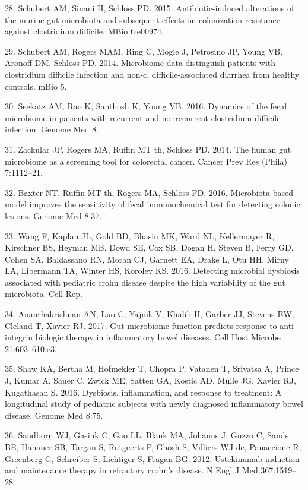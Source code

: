 \documentclass[11pt,]{article}
\begin{document}
\hypertarget{ref-Schubert_cdiff_2016}{}
28. Schubert AM, Sinani H, Schloss PD. 2015. Antibiotic-induced
alterations of the murine gut microbiota and subsequent effects on
colonization resistance against clostridium difficile. MBio 6:e00974.

\hypertarget{ref-Schubert_cdiff_2014}{}
29. Schubert AM, Rogers MAM, Ring C, Mogle J, Petrosino JP, Young VB,
Aronoff DM, Schloss PD. 2014. Microbiome data distinguish patients with
clostridium difficile infection and non-c. difficile-associated diarrhea
from healthy controls. mBio 5.

\hypertarget{ref-Seekatz_cdiff_2016}{}
30. Seekatz AM, Rao K, Santhosh K, Young VB. 2016. Dynamics of the fecal
microbiome in patients with recurrent and nonrecurrent clostridium
difficile infection. Genome Med 8.

\hypertarget{ref-zackular_CRC_2014}{}
31. Zackular JP, Rogers MA, Ruffin MT th, Schloss PD. 2014. The human
gut microbiome as a screening tool for colorectal cancer. Cancer Prev
Res (Phila) 7:1112--21.

\hypertarget{ref-baxter_FIT_2016}{}
32. Baxter NT, Ruffin MT th, Rogers MA, Schloss PD. 2016.
Microbiota-based model improves the sensitivity of fecal immunochemical
test for detecting colonic lesions. Genome Med 8:37.

\hypertarget{ref-wang_pedsCD_2016}{}
33. Wang F, Kaplan JL, Gold BD, Bhasin MK, Ward NL, Kellermayer R,
Kirschner BS, Heyman MB, Dowd SE, Cox SB, Dogan H, Steven B, Ferry GD,
Cohen SA, Baldassano RN, Moran CJ, Garnett EA, Drake L, Otu HH, Mirny
LA, Libermann TA, Winter HS, Korolev KS. 2016. Detecting microbial
dysbiosis associated with pediatric crohn disease despite the high
variability of the gut microbiota. Cell Rep.

\hypertarget{ref-Ananthakrishnan_IBD_2017}{}
34. Ananthakrishnan AN, Luo C, Yajnik V, Khalili H, Garber JJ, Stevens
BW, Cleland T, Xavier RJ. 2017. Gut microbiome function predicts
response to anti-integrin biologic therapy in inflammatory bowel
diseases. Cell Host Microbe 21:603--610.e3.

\hypertarget{ref-Shaw_response_2016}{}
35. Shaw KA, Bertha M, Hofmekler T, Chopra P, Vatanen T, Srivatsa A,
Prince J, Kumar A, Sauer C, Zwick ME, Satten GA, Kostic AD, Mulle JG,
Xavier RJ, Kugathasan S. 2016. Dysbiosis, inflammation, and response to
treatment: A longitudinal study of pediatric subjects with newly
diagnosed inflammatory bowel disease. Genome Med 8:75.

\hypertarget{ref-sandborn_ust_2012}{}
36. Sandborn WJ, Gasink C, Gao LL, Blank MA, Johanns J, Guzzo C, Sands
BE, Hanauer SB, Targan S, Rutgeerts P, Ghosh S, Villiers WJ de,
Panaccione R, Greenberg G, Schreiber S, Lichtiger S, Feagan BG. 2012.
Ustekinumab induction and maintenance therapy in refractory crohn's
disease. N Engl J Med 367:1519--28.
\end{document}
